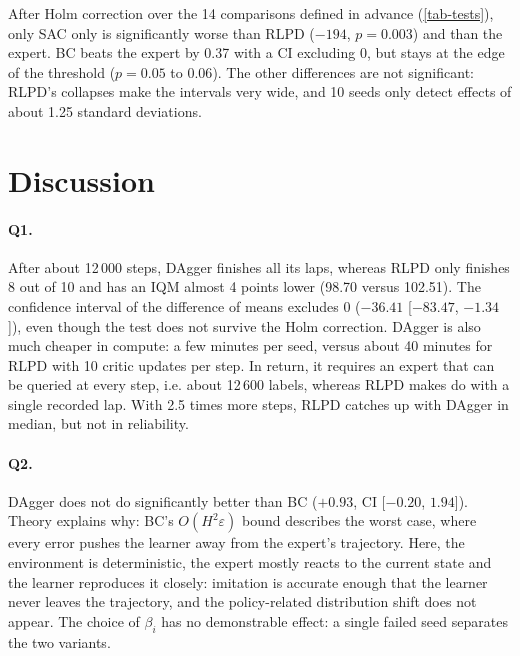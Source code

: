 \documentclass[10pt,a4paper,english]{article}
\begin{document}
After Holm correction over the 14 comparisons defined in advance (\cref{tab-tests}), only SAC only is significantly worse than RLPD ($-194$, $p = 0.003$) and than the expert. BC beats the expert by 0.37 with a CI excluding 0, but stays at the edge of the threshold ($p = 0.05$ to $0.06$). The other differences are not significant: RLPD's collapses make the intervals very wide, and 10 seeds only detect effects of about 1.25 standard deviations.

\begin{table}[t]
  \centering
  \footnotesize
  \caption{Comparisons between methods and with the expert: difference of means ($\Delta$, with 95\,\% bootstrap CI) and $p$-values corrected with the Holm method over all 14 tests. Against the deterministic expert, the tests are one-sample (Student and Wilcoxon).}
  \label{tab-tests}
\end{table}

\section{Discussion}
\label{sec-discussion}

\paragraph{Q1.} After about 12\,000 steps, DAgger finishes all its laps, whereas RLPD only finishes 8 out of 10 and has an IQM almost 4 points lower (98.70 versus 102.51). The confidence interval of the difference of means excludes 0 ($-36.41$ [$-83.47$, $-1.34$]), even though the test does not survive the Holm correction. DAgger is also much cheaper in compute: a few minutes per seed, versus about 40 minutes for RLPD with 10 critic updates per step. In return, it requires an expert that can be queried at every step, i.e. about 12\,600 labels, whereas RLPD makes do with a single recorded lap. With 2.5 times more steps, RLPD catches up with DAgger in median, but not in reliability.

\paragraph{Q2.} DAgger does not do significantly better than BC ($+0.93$, CI [$-0.20$, $1.94$]). Theory explains why: BC's $O(H^2\varepsilon)$ bound describes the worst case, where every error pushes the learner away from the expert's trajectory. Here, the environment is deterministic, the expert mostly reacts to the current state and the learner reproduces it closely: imitation is accurate enough that the learner never leaves the trajectory, and the policy-related distribution shift does not appear. The choice of $\beta_i$ has no demonstrable effect: a single failed seed separates the two variants.
\end{document}
